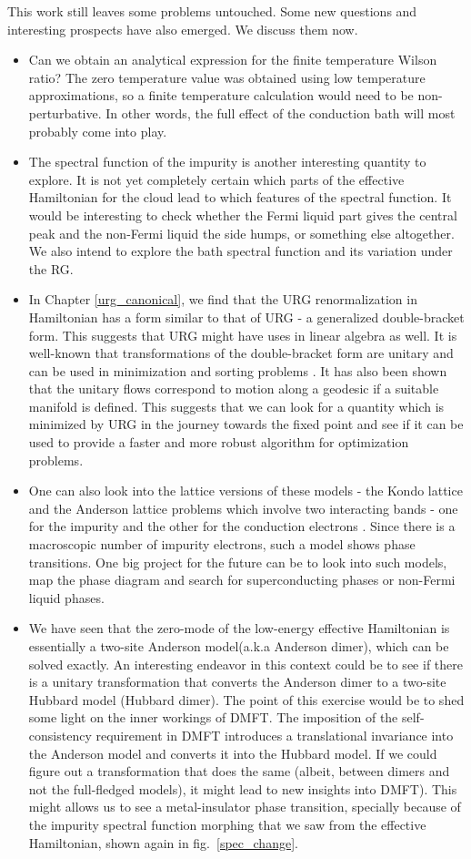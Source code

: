 \documentclass[12pt,twoside]{report}
\numberwithin{equation}{section}
\begin{document}
\pb This work still leaves some problems untouched. Some new questions and interesting prospects have also emerged. We discuss them now.
\begin{itemize}
	\item Can we obtain an analytical expression for the finite temperature Wilson ratio? The zero temperature value was obtained using low temperature approximations, so a finite temperature calculation would need to be non-perturbative. In other words, the full effect of the conduction bath will most probably come into play.
	\item The spectral function of the impurity is another interesting quantity to explore. It is not yet completely certain which parts of the effective Hamiltonian for the cloud lead to which features of the spectral function. It would be interesting to check whether the Fermi liquid part gives the central peak and the non-Fermi liquid the side humps, or something else altogether. We also intend to explore the bath spectral function and its variation under the RG.
	\item In Chapter \ref{urg_canonical}, we find that the URG renormalization in Hamiltonian has a form similar to that of URG - a generalized double-bracket form. This suggests that URG might have uses in linear algebra as well. It is well-known that transformations of the double-bracket form are unitary and can be used in minimization and sorting problems \cite{Brockett1991}. It has also been shown that the unitary flows correspond to motion along a geodesic if a suitable manifold is defined. This suggests that we can look for a quantity which is minimized by URG in the journey towards the fixed point and see if it can be used to provide a faster and more robust algorithm for optimization problems.
	\item One can also look into the lattice versions of these models - the Kondo lattice and the Anderson lattice problems which involve two interacting bands - one for the impurity and the other for the conduction electrons \cite{gulacsi}. Since there is a macroscopic number of impurity electrons, such a model shows phase transitions. One big project for the future can be to look into such models, map the phase diagram and search for superconducting phases or non-Fermi liquid phases.
	\item We have seen that the zero-mode of the low-energy effective Hamiltonian is essentially a two-site Anderson model(a.k.a Anderson dimer), which can be solved exactly. An interesting endeavor in this context could be to see if there is a unitary transformation that converts the Anderson dimer to a two-site Hubbard model (Hubbard dimer). The point of this exercise would be to shed some light on the inner workings of DMFT. The imposition of the self-consistency requirement in DMFT introduces a translational invariance into the Anderson model and converts it into the Hubbard model. If we could figure out a transformation that does the same (albeit, between dimers and not the full-fledged models), it might lead to new insights into DMFT). This might allows us to see a metal-insulator phase transition, specially because of the impurity spectral function morphing that we saw from the effective Hamiltonian, shown again in fig.~\ref{spec_change}.

\end{itemize}
\end{document}
